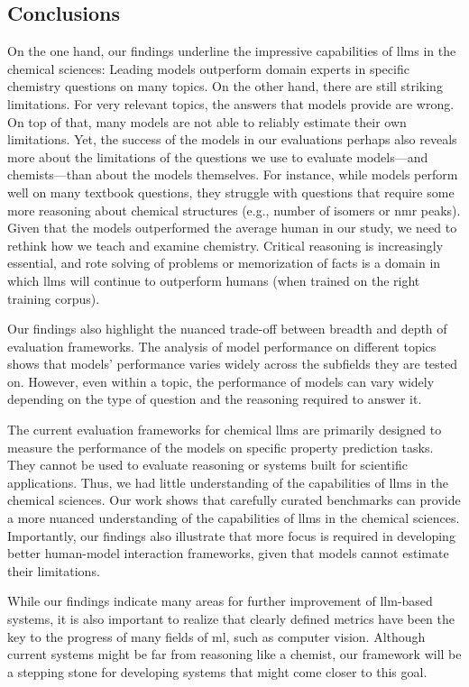 \documentclass[11pt, oneside]{article}
\begin{document}
\begin{refsection}
\section{Conclusions}
On the one hand, our findings underline the impressive capabilities of \glspl{llm} in the chemical sciences: Leading models outperform domain experts in specific chemistry questions on many topics.
On the other hand, there are still striking limitations.
For very relevant topics, the answers that models provide are wrong.
On top of that, many models are not able to reliably estimate their own limitations.
Yet, the success of the models in our evaluations perhaps also reveals more about the limitations of the questions we use to evaluate models---and chemists---than about the models themselves.
For instance, while models perform well on many textbook questions, they struggle with questions that require some more reasoning about chemical structures (e.g., number of isomers or \gls{nmr} peaks).
Given that the models outperformed the average human in our study, we need to rethink how we teach and examine chemistry.
Critical reasoning is increasingly essential, and rote solving of problems or memorization of facts is a domain in which \glspl{llm} will continue to outperform humans (when trained on the right training corpus).

Our findings also highlight the nuanced trade-off between breadth and depth of evaluation frameworks.
The analysis of model performance on different topics shows that models' performance varies widely across the subfields they are tested on.
However, even within a topic, the performance of models can vary widely depending on the type of question and the reasoning required to answer it.

The current evaluation frameworks for chemical \glspl{llm} are primarily designed to measure the performance of the models on specific property prediction tasks.
They cannot be used to evaluate reasoning or systems built for scientific applications.
Thus, we had little understanding of the capabilities of \glspl{llm} in the chemical sciences.
Our work shows that carefully curated benchmarks can provide a more nuanced understanding of the capabilities of \glspl{llm} in the chemical sciences.
Importantly, our findings also illustrate that more focus is required in developing better human-model interaction frameworks, given that models cannot estimate their limitations.

While our findings indicate many areas for further improvement of \gls{llm}-based systems, it is also important to realize that clearly defined metrics have been the key to the progress of many fields of \gls{ml}, such as computer vision.
Although current systems might be far from reasoning like a chemist, our \chembench framework will be a stepping stone for developing systems that might come closer to this goal.


\end{refsection}
\end{document}
